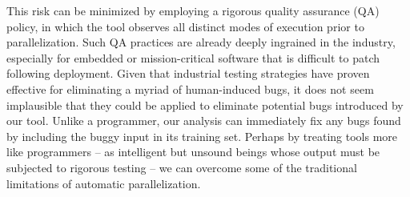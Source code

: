 This risk can be minimized by employing a rigorous quality assurance
(QA) policy, in which the tool observes all distinct modes of
execution prior to parallelization.  Such QA practices are already
deeply ingrained in the industry, especially for embedded or
mission-critical software that is difficult to patch following
deployment.  Given that industrial testing strategies have proven
effective for eliminating a myriad of human-induced bugs, it does not
seem implausible that they could be applied to eliminate potential
bugs introduced by our tool.  Unlike a programmer, our analysis can
immediately fix any bugs found by including the buggy input in its
training set.  Perhaps by treating tools more like programmers -- as
intelligent but unsound beings whose output must be subjected to
rigorous testing -- we can overcome some of the traditional
limitations of automatic parallelization.

